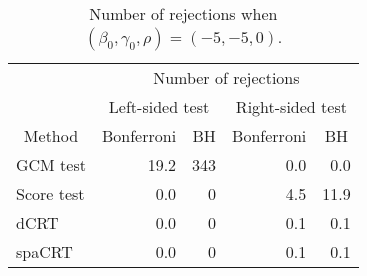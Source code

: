 \begin{table}[!h]
\centering
\caption{\label{tab:simulation_rejection_beta_-5_gamma_-5}Number of rejections when $(\beta_0,\gamma_0,\rho) = (-5, -5, 0)$.}
\centering
\begin{tabular}[t]{lrrrr}
\toprule
\multicolumn{1}{c}{ } & \multicolumn{4}{c}{Number of rejections} \\
\cmidrule(l{3pt}r{3pt}){2-5}
\multicolumn{1}{c}{ } & \multicolumn{2}{c}{Left-sided test} & \multicolumn{2}{c}{Right-sided test} \\
\cmidrule(l{3pt}r{3pt}){2-3} \cmidrule(l{3pt}r{3pt}){4-5}
\multicolumn{1}{c}{Method} & \multicolumn{1}{c}{Bonferroni} & \multicolumn{1}{c}{BH} & \multicolumn{1}{c}{Bonferroni} & \multicolumn{1}{c}{BH} \\
\cmidrule(l{3pt}r{3pt}){1-1} \cmidrule(l{3pt}r{3pt}){2-2} \cmidrule(l{3pt}r{3pt}){3-3} \cmidrule(l{3pt}r{3pt}){4-4} \cmidrule(l{3pt}r{3pt}){5-5}
GCM test & 19.2 & 343 & 0.0 & 0.0\\
Score test & 0.0 & 0 & 4.5 & 11.9\\
dCRT & 0.0 & 0 & 0.1 & 0.1\\
spaCRT & 0.0 & 0 & 0.1 & 0.1\\
\bottomrule
\end{tabular}
\end{table}
